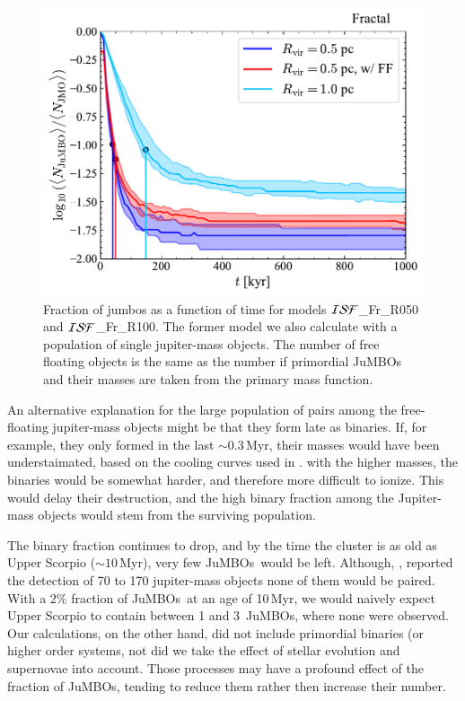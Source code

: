 \documentclass[submission,phys]{lib/SciPost}
\newcommand{\jumbos}{\mbox{JuMBOs}}
\begin{document}
   \begin{figure}
    \centering
    \includegraphics[width=\columnwidth]{figures/Fractal_General__fJuMBO_evol.pdf
    }
        \caption{Fraction of jumbos as a function of time for models
          ${\cal ISF}$\_Fr\_R050 and ${\cal ISF}$\_Fr\_R100. The
          former model we also calculate with a population of single
          jupiter-mass objects. The number of free floating objects is
          the same as the number if primordial \jumbos\, and their
          masses are taken from the primary mass function.}
         \label{Fig:Fjumbo_vs_time_model_ISF_R05}
   \end{figure}

An alternative explanation for the large population of pairs among the
free-floating jupiter-mass objects might be that they form late as
binaries. If, for example, they only formed in the last $\sim
0.3$\,Myr, their masses would have been understaimated, based on the
cooling curves used in \cite{2023arXiv231001231P}. with the higher
masses, the binaries would be somewhat harder, and therefore more
difficult to ionize. This would delay their destruction, and the high
binary fraction among the Jupiter-mass objects would stem from the
surviving population.

The binary fraction continues to drop, and by the time the cluster is
as old as Upper Scorpio ($\sim 10$\,Myr), very few \jumbos\, would be
left.  Although, \cite{2022NatAs...6...89M}, reported the detection of
70 to 170 jupiter-mass objects none of them would be paired.  With a
2\% fraction of \jumbos\, at an age of 10\,Myr, we would naively
expect Upper Scorpio to contain between 1 and 3 \,\jumbos, where none
were observed. Our calculations, on the other hand, did not include
primordial binaries (or higher order systems, not did we take the
effect of stellar evolution and supernovae into account. Those
processes may have a profound effect of the fraction of \jumbos,
tending to reduce them rather then increase their number.
\end{document}
